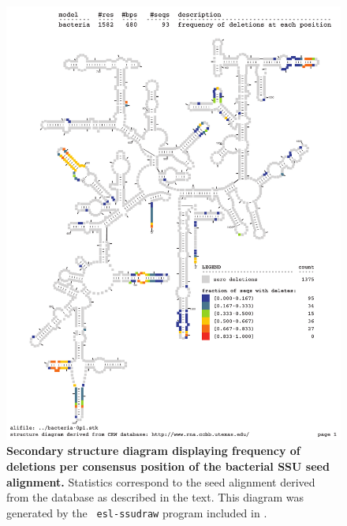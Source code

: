 \begin{figure}
\begin{center}
\includegraphics[width=5.5in]{../../seeds/ss-diagrams/bacteria-0p1-dall}
\end{center}
\caption[Secondary structure diagram displaying frequency of deletions
  per consensus position of the bacterial SSU seed
  alignment]{\textbf{Secondary structure diagram displaying frequency 
  of deletions per consensus position of the bacterial SSU seed
  alignment.} Statistics correspond to the  seed
  alignment derived from the  database \cite{CannoneGutell02}
  as described in the text. This diagram was generated by the {\tt
  esl-ssudraw} program included in .}
\label{fig:bacdel}
\end{figure}


